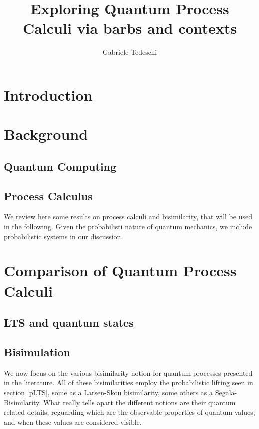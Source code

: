 \documentclass[10pt,a4paper, titlepage]{report}
\title{Exploring Quantum Process Calculi via barbs and contexts }
\author{Gabriele Tedeschi}
\theoremstyle{remark}
\begin{document}
\maketitle

\tableofcontents

\chapter{Introduction}



\chapter{Background}

\section{Quantum Computing}


\section{Process Calculus}
We review here some results on
process calculi and bisimilarity, that will
be used in the following.
Given the probabilisti nature of quantum
mechanics, we include probabilistic systems
in our discussion.
	





\chapter{Comparison of Quantum Process Calculi}\label{chapter3}



\section{LTS and quantum states}


\section{Bisimulation}\label{stateOfTheAr_Bisimulation}
We now focus on the various bisimilarity notion for quantum processes presented in the literature. All of these bisimilarities employ the probabilistic lifting seen in section \ref{pLTS}, some as a Larsen-Skou bisimilarity, some others as a Segala-Bisimilarity.  What really tells apart the different notions are their quantum related details, reguarding which are the observable properties of quantum values, and when these values are considered visible.
 
\end{document}
